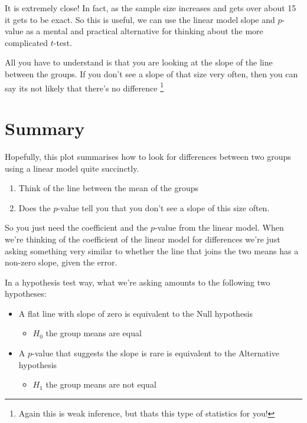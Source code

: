 \documentclass[
]{book}
\providecommand{\tightlist}{%
  \setlength{\itemsep}{0pt}\setlength{\parskip}{0pt}}
\begin{document}
It is extremely close! In fact, as the sample size increases and gets over about 15 it gets to be exact. So this is useful, we can use the linear model slope and \(p\)-value as a mental and practical alternative for thinking about the more complicated \(t\)-test.

All you have to understand is that you are looking at the slope of the line between the groups. If you don't see a slope of that size very often, then you can say its not likely that there's no difference \footnote{Again this is weak inference, but thats this type of statistics for you!}

\hypertarget{summary}{%
\section{Summary}\label{summary}}

Hopefully, this plot summarises how to look for differences between two groups using a linear model quite succinctly.

\begin{enumerate}
\def\labelenumi{\arabic{enumi}.}
\tightlist
\item
  Think of the line between the mean of the groups
\item
  Does the \(p\)-value tell you that you don't see a slope of this size often.
\end{enumerate}

So you just need the coefficient and the \(p\)-value from the linear model.
When we're thinking of the coefficient of the linear model for differences we're just asking something very similar to whether the line that joins the two means has a non-zero slope, given the error.

In a hypothesis test way, what we're asking amounts to the following two hypotheses:

\begin{itemize}
\tightlist
\item
  A flat line with slope of zero is equivalent to the Null hypothesis

  \begin{itemize}
  \tightlist
  \item
    \(H_{0}\) the group means are equal
  \end{itemize}
\item
  A \(p\)-value that suggests the slope is rare is equivalent to the Alternative hypothesis

  \begin{itemize}
  \tightlist
  \item
    \(H_{1}\) the group means are not equal
  \end{itemize}
\end{itemize}
\end{document}
